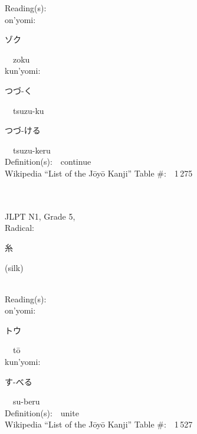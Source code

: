 \begin{multicols}{2}
Reading(s):\ \ \\
{\hspace*{1em}}on'yomi:\ \ \\
{\hspace*{2em}}{\begin{CJK}{UTF8}{min} ゾク \end{CJK}}\ \ zoku\ \ \\
{\hspace*{1em}}kun'yomi:\ \ \\
{\hspace*{2em}}{\begin{CJK}{UTF8}{min} つづ-く \end{CJK}}\ \ tsuzu-ku\ \ \\
{\hspace*{2em}}{\begin{CJK}{UTF8}{min} つづ-ける \end{CJK}}\ \ tsuzu-keru\ \ \\
Definition(s):\ \ continue \\
Wikipedia ``List of the J\=oy\=o Kanji'' Table \#:\ \ 1\,275 \\
\ \ \\
{\fontsize{34pt}{40pt}  }\ \ \\  %
{JLPT N1, Grade 5, \\Radical:\ \ {\begin{CJK}{UTF8}{min} 糸 \end{CJK}} (silk) } \\
Reading(s):\ \ \\
{\hspace*{1em}}on'yomi:\ \ \\
{\hspace*{2em}}{\begin{CJK}{UTF8}{min} トウ \end{CJK}}\ \ t\=o\ \ \\
{\hspace*{1em}}kun'yomi:\ \ \\
{\hspace*{2em}}{\begin{CJK}{UTF8}{min} す-べる \end{CJK}}\ \ su-beru\ \ \\
Definition(s):\ \ unite \\
Wikipedia ``List of the J\=oy\=o Kanji'' Table \#:\ \ 1\,527 \\

\end{multicols}
